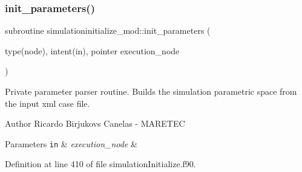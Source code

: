 \subsubsection{\texorpdfstring{init\+\_\+parameters()}{init\_parameters()}}
{\footnotesize\ttfamily subroutine simulationinitialize\+\_\+mod\+::init\+\_\+parameters (\begin{DoxyParamCaption}\item[{type(node), intent(in), pointer}]{execution\+\_\+node }\end{DoxyParamCaption})\hspace{0.3cm}{\ttfamily [private]}}



Private parameter parser routine. Builds the simulation parametric space from the input xml case file. 

\begin{DoxyAuthor}{Author}
Ricardo Birjukovs Canelas -\/ M\+A\+R\+E\+T\+EC 
\end{DoxyAuthor}

\begin{DoxyParams}[1]{Parameters}
\mbox{\tt in}  & {\em execution\+\_\+node} & \\
\hline
\end{DoxyParams}


Definition at line 410 of file simulation\+Initialize.\+f90.


